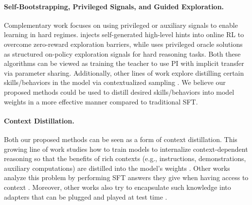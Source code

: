 \documentclass[]{servicenow} %
\begin{document}
\paragraph{Self-Bootstrapping, Privileged Signals, and Guided Exploration.}
Complementary work focuses on using privileged or auxiliary signals to enable learning in hard regimes. \cite{chen2025nudgingboundariesllmreasoning} injects self-generated high-level hints into online RL to overcome zero-reward exploration barriers, while \cite{qu2026popelearningreasonhard} uses privileged oracle solutions as structured on-policy exploration signals for hard reasoning tasks. Both these algorithms can be viewed as training the teacher to use PI with implicit transfer via parameter sharing. Additionally, other lines of work explore distilling certain skills/behaviors in the model via contextualized sampling \citep{didolkar2025metacognitivereuseturningrecurring, didolkar2024metacognitivecapabilitiesllmsexploration,yang-etal-2025-distilling,qu2025rladtrainingllmsdiscover}. We believe our proposed methods could be used to distill desired skills/behaviors into model weights in a more effective manner compared to traditional SFT.


\paragraph{Context Distillation.}
Both our proposed methods can be seen as a form of context distillation. This growing line of work studies how to train models to internalize context-dependent reasoning so that the benefits of rich contexts (e.g., instructions, demonstrations, auxiliary computations) are distilled into the model’s weights \citep{caccia2025trainingplugnplayknowledgemodules,snell2022learningdistillingcontext,huang2022incontextlearningdistillationtransferring}. Other works analyze this problem by performing SFT answers they give when having access to context \cite{snell2022learningdistillingcontext}. Moreover, other works also try to encapsulate such knowledge into adapters that can be plugged and played at test time \citep{caccia2025trainingplugnplayknowledgemodules}. 



\end{document}
